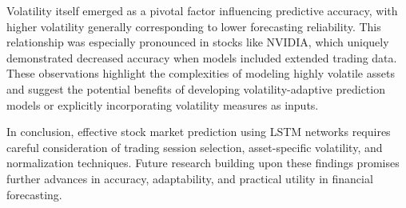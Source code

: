 \documentclass[10pt,a4paper]{article}
\begin{document}
Volatility itself emerged as a pivotal factor influencing predictive accuracy, with higher volatility generally corresponding to lower forecasting reliability. This relationship was especially pronounced in stocks like NVIDIA, which uniquely demonstrated decreased accuracy when models included extended trading data. These observations highlight the complexities of modeling highly volatile assets and suggest the potential benefits of developing volatility-adaptive prediction models or explicitly incorporating volatility measures as inputs. 

In conclusion, effective stock market prediction using LSTM networks requires careful consideration of trading session selection, asset-specific volatility, and normalization techniques. Future research building upon these findings promises further advances in accuracy, adaptability, and practical utility in financial forecasting.

\newpage


\newpage

%
%



\end{document}
